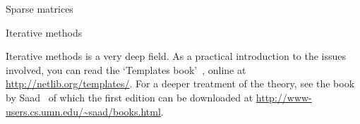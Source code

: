 
 {Sparse matrices}
\label{sec:sparse}


 {Iterative methods}
\label{sec:iterative}



\furtherreading

Iterative methods is a very deep field. As a practical introduction to
the issues involved, you can read the `Templates
book'~\cite{Ba:templates}, online at
\url{http://netlib.org/templates/}. For a deeper treatment of the
theory, see the book by Saad~\cite{saad96} of which the first edition
can be downloaded at
\url{http://www-users.cs.umn.edu/~saad/books.html}.
